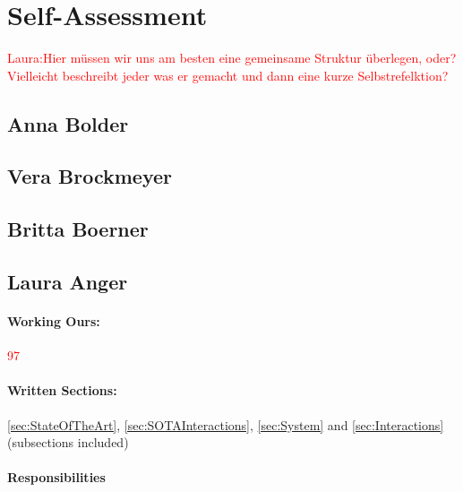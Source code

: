 \section{Self-Assessment} \label{sec:SA} %

\textcolor{red}{Laura:Hier müssen wir uns am besten eine gemeinsame Struktur überlegen, oder? Vielleicht beschreibt jeder was er gemacht und dann eine kurze Selbstrefelktion?}


\subsection{Anna Bolder} \label{sec:SAAnna}



\subsection{Vera Brockmeyer} \label{sec:SAVera}

\subsection{Britta Boerner} \label{sec:SABritta}

\newpage
\subsection{Laura Anger} \label{sec:SALaura}

\paragraph{Working Ours:} \textcolor{red}{97}
\paragraph{Written Sections:} \ref{sec:StateOfTheArt},  \ref{sec:SOTAInteractions}, \ref{sec:System} and \ref{sec:Interactions} (subsections included)
\paragraph{Responsibilities}

